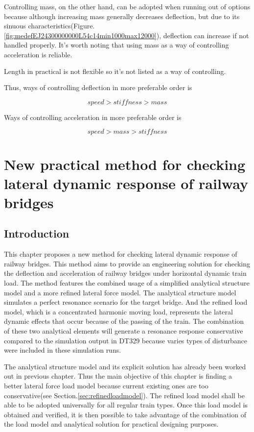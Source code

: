 Controlling mass, on the other hand, can be adopted when running out of options because although increasing mass generally decreases deflection, but due to its sinuous characteristics(Figure.\ref{fig:medefEJ24300000000L54c14min1000max12000}), deflection can increase if not handled properly. It's worth noting that using mass as a way of controlling acceleration is reliable.

Length in practical is not flexible so it's not listed as a way of controlling.

Thus, ways of controlling deflection in more preferable order is 

$$speed > stiffness > mass$$

Ways of controlling acceleration in more preferable order is 

$$speed > mass > stiffness$$


\chapter{New practical method for checking lateral dynamic response of railway bridges}

\section{Introduction}

This chapter proposes a new method for checking lateral dynamic response of railway bridges. This method aims to provide an engineering solution for checking the deflection and acceleration of railway bridges under horizontal dynamic train load. The method features the combined usage of a simplified analytical structure model and a more refined lateral force model. The analytical structure model simulates a perfect resonance scenario for the target bridge. And the refined load model, which is a concentrated harmonic moving load, represents the lateral dynamic effects that occur because of the passing of the train. The combination of these two analytical elements will generate a resonance response conservative compared to the simulation output in DT329 because varies types of disturbance were included in these simulation runs.

The analytical structure model and its explicit solution has already been worked out in previous chapter. Thus the main objective of this chapter is finding a better lateral force load model because current existing ones are too conservative(see Section.\ref{sec:refinedloadmodel}). The refined load model shall be able to be adopted universally for all regular train types. Once this load model is obtained and verified, it is then possible to take advantage of the combination of the load model and analytical solution for practical designing purposes.

